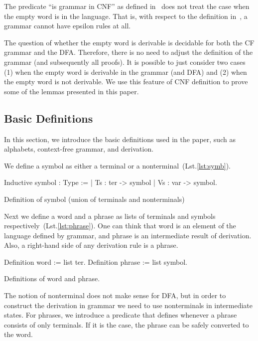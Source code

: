 The predicate ``is grammar in CNF'' as defined in~\cite{smolkaHofmann2016} does not treat the case when the empty word is in the language. That is, with respect to the definition in~\cite{smolkaHofmann2016}, a grammar cannot have epsilon rules at all.

The question of whether the empty word is derivable is decidable for both the CF grammar and the DFA. Therefore, there is no need to adjust the definition of the grammar (and subsequently all proofs). It is possible to just consider two cases (1) when the empty word is derivable in the grammar (and DFA) and (2) when the empty word is not derivable. We use this feature of CNF definition to prove some of the lemmas presented in this paper.

\subsection{Basic Definitions}

In this section, we introduce the basic definitions used in the paper, such as alphabets, context-free grammar, and derivation.

We define a symbol as either a terminal or a nonterminal~(Lst.\ref{lst:symb}).

\begin{listing}[h]
    \begin{pyglist}[language=coq, numbers=none, numbersep=5pt]
  Inductive symbol : Type :=
    | Ts : ter -> symbol
    | Vs : var -> symbol.
    \end{pyglist}
    \caption{Definition of symbol (union of terminals and nonterminals)}
    \label{lst:symb}
\end{listing}

Next we define a word and a phrase as lists of terminals and symbols respectively~(Lst.\ref{lst:phrase}).
One can think that word is an element of the language defined by grammar, and phrase is an intermediate result of derivation.
Also, a right-hand side of any derivation rule is a phrase.

\begin{listing}[h]
    \begin{pyglist}[language=coq, numbers=none, numbersep=5pt]
  Definition word := list ter.
  Definition phrase := list symbol.
    \end{pyglist}
    \caption{Definitions of word and phrase.}
    \label{lst:phrase}
\end{listing}

The notion of nonterminal does not make sense for DFA, but in order to construct the derivation in grammar we need to use nonterminals in intermediate states. For phrases, we introduce a predicate that defines whenever a phrase consists of only terminals. If it is the case, the phrase can be safely converted to the word.

